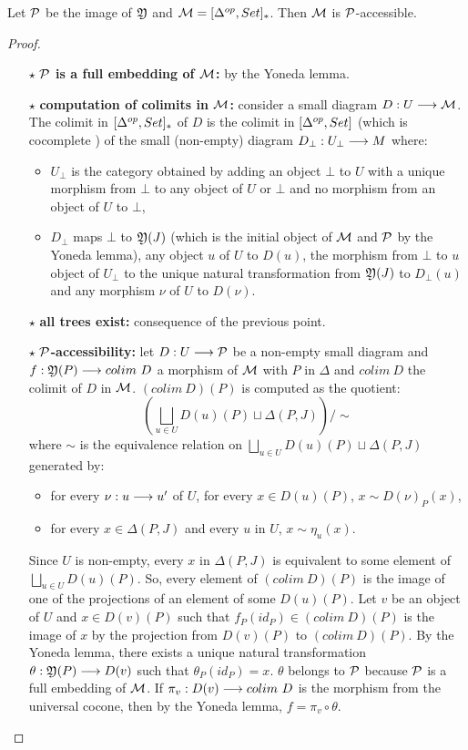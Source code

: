 \begin{theo}
Let $\mathcal{P}$ be the image of $\mathfrak{Y}$ and $\mathcal{M} = [\Delta^{op},Set]_*$. Then $\mathcal{M}$ is $\mathcal{P}$-accessible.
\end{theo}

\begin{proof}~
		\begin{itemize}
			\item[$\star$] \textbf{$\mathcal{P}$ is a full embedding of $\mathcal{M}$:} by the Yoneda lemma.
			\item[$\star$] \textbf{computation of colimits in $\mathcal{M}$:} consider a small diagram $D : U \longrightarrow \mathcal{M}$. The colimit in $[\Delta^{op},Set]_*$ of $D$ is the colimit in $[\Delta^{op},Set]$ (which is cocomplete \cite{borceux94b}) of the small (non-empty) diagram $D_\bot : U_\bot \longrightarrow M$ where:
				\begin{itemize}
					\item $U_\bot$ is the category obtained by adding an object $\bot$ to $U$ with a unique morphism from $\bot$ to any object of $U$ or $\bot$ and no morphism from an object of $U$ to $\bot$,
					\item $D_\bot$ maps $\bot$ to $\mathfrak{Y}(J)$ (which is the initial object of $\mathcal{M}$ and $\mathcal{P}$ by the Yoneda lemma), any object $u$ of $U$ to $D(u)$, the morphism from $\bot$ to $u$ object of $U_\bot$ to the unique natural transformation from $\mathfrak{Y}(J)$ to $D_\bot(u)$ and any morphism $\nu$ of $U$ to $D(\nu)$.
				\end{itemize}
			\item[$\star$] \textbf{all trees exist:} consequence of the previous point.
			\item[$\star$] \textbf{$\mathcal{P}$-accessibility:} let $D : U \longrightarrow \mathcal{P}$ be a non-empty small diagram and $\map{f}{\yon(P)}{colim \ D}$ a morphism of $\mathcal{M}$ with $P$ in $\Delta$ and $colim \ D$ the colimit of $D$ in $\mathcal{M}$. $(colim \ D)(P)$ is computed as the quotient:
$$(\bigsqcup\limits_{u \in U} D(u)(P) \sqcup \Delta(P,J))/\sim$$
where $\sim$ is the equivalence relation on $\bigsqcup\limits_{u \in U} D(u)(P) \sqcup \Delta(P,J)$ generated by:
	\begin{itemize}
		\item for every $\nu : u \longrightarrow u'$ of $U$, for every $x \in D(u)(P)$, $x \sim D(\nu)_P(x)$,
		\item for every $x \in \Delta(P,J)$ and every $u$ in $U$, $x \sim \eta_u(x)$.
	\end{itemize}
	
Since $U$ is non-empty, every $x$ in $\Delta(P,J)$ is equivalent to some element of $\bigsqcup\limits_{u \in U} D(u)(P)$. So, every element of $(colim \ D)(P)$ is the image of one of the projections of an element of some $D(u)(P)$. Let $v$ be an object of $U$ and $x \in D(v)(P)$ such that $f_P(id_P) \in (colim \ D)(P)$ is the image of $x$ by the projection from $D(v)(P)$ to $(colim \ D)(P)$. By the Yoneda lemma, there exists a unique natural transformation $\theta : \mathfrak{Y}(P) \longrightarrow D(v)$ such that $\theta_P(id_P) = x$. $\theta$ belongs to $\mathcal{P}$ because $\mathcal{P}$ is a full embedding of $\mathcal{M}$. If $\pi_v : D(v) \longrightarrow colim \ D$ is the morphism from the universal cocone, then by the Yoneda lemma, $f = \pi_v\circ\theta$.
		\end{itemize}
\end{proof}
